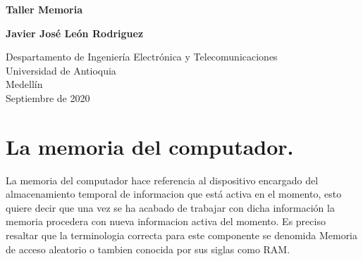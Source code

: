 \documentclass[12pt]{article}
\begin{document}
\begin{titlepage}
    \begin{center}
        \vspace*{1cm}
            
        \Huge
        
        \textbf{Taller Memoria}
            
        \vspace{0.5cm}
        \LARGE
    
            
        \vspace{3cm}
            
        \textbf{Javier José León Rodriguez}
            
        \vfill
            
        \vspace{0.8cm}
            
        \Large
        Despartamento de Ingeniería Electrónica y Telecomunicaciones\\
        Universidad de Antioquia\\
        Medellín\\
        Septiembre de 2020
            
    \end{center}
\end{titlepage}

\tableofcontents
\vspace{0.5cm}
\section{La memoria del computador.}
La memoria del computador hace referencia al dispositivo encargado del almacenamiento temporal de informacion que está activa en el momento, esto quiere decir que una vez se ha acabado de trabajar con dicha información la memoria procedera con nueva informacion activa del momento. Es preciso resaltar que la terminologia correcta para este componente se denomida Memoria de acceso aleatorio o tambien conocida por sus siglas como RAM.

 \vspace{0.5cm}
 
\end{document}
